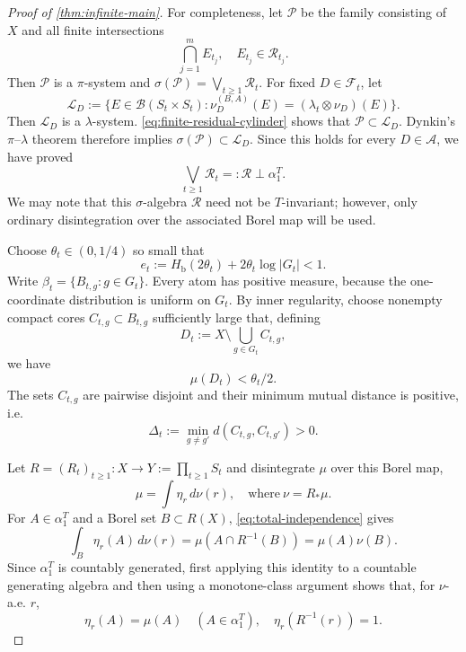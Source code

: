 \documentclass[12pt,letterpaper,reqno]{amsart}
\newcommand{\cR}{\mathcal R}
\newcommand{\join}{\bigvee}
\newcommand{\Hb}{H_{\mathrm b}}
\theoremstyle{definition}
\theoremstyle{remark}
\numberwithin{equation}{section}
\begin{document}
\begin{proof}[Proof of \cref{thm:infinite-main}]
		For completeness, let $\mathscr P$ be the family consisting of $X$ and all
		finite intersections
		\[
		\bigcap_{j=1}^m E_{t_j},
		\quad E_{t_j}\in\mathcal R_{t_j}.
		\]
		Then $\mathscr P$ is a $\pi$-system and
		$\sigma(\mathscr P)=\bigvee_{t\geq1}\mathcal R_t$. For fixed \(D\in\mathcal F_t\), let
		\[
		\mathscr L_D
		:=
		\{E\in\mathcal B(S_t\times S_t):
		\nu_D^{(B,A)}(E)=(\lambda_t\otimes\nu_D)(E)\}.
		\]
		Then \(\mathscr L_D\) is a \(\lambda\)-system.
		\eqref{eq:finite-residual-cylinder} shows that
		$\mathscr P\subset\mathscr L_D$.  Dynkin's $\pi$--$\lambda$ theorem therefore
		implies $\sigma(\mathscr P)\subset\mathscr L_D$.  Since this holds for every
		$D\in\mathcal A$, we have proved
		\begin{equation}
			\join_{t\geq1}\cR_t =:\cR
			\perp
			\alpha_1^T.
			\label{eq:total-independence}
		\end{equation}
		We may note that this $\sigma$-algebra $\cR$ need not be $T$-invariant; however, only ordinary
		disintegration over the associated Borel map will be used.
		
		
		Choose
		$\theta_t\in(0,1/4)$ so small that
		\begin{equation}
			e_t:=\Hb(2\theta_t)+2\theta_t\log|G_t|<1.
			\label{eq:hamming-error}
		\end{equation}
		Write $\beta_t=\{B_{t,g}:g\in G_t\}$.  Every atom has positive measure,
		because the one-coordinate distribution is uniform on
		$G_t$.  By inner regularity, choose nonempty compact cores
		$C_{t,g}\subset B_{t,g}$ sufficiently large that, defining
		\[
		D_t:=X\setminus\bigcup_{g\in G_t}C_{t,g},
		\]
		we have
		\begin{equation}
			\mu(D_t)<\theta_t/2.
			\label{eq:bad-set-small}
		\end{equation}
		The sets $C_{t,g}$ are pairwise disjoint and their minimum mutual distance is positive, i.e.
		\begin{equation}
			\Delta_t
			:=
			\min_{g\neq g'}d(C_{t,g},C_{t,g'})>0.
			\label{eq:compact-core-gap}
		\end{equation}
		
		Let $R=(R_t)_{t\geq1}: X \to Y:= \prod_{t\geq 1} S_t$ and disintegrate $\mu$ over this Borel map,
		\[
		\mu=\int\eta_r\,d\nu(r), \quad \text{where}~\nu=R_* \mu.
		\]
		For $A\in\alpha_1^T$ and a Borel set $B \subset R(X)$,
		\eqref{eq:total-independence} gives
		\[
		\int_B\eta_r(A)\,d\nu(r)
		=
		\mu(A\cap R^{-1}(B))
		=
		\mu(A)\nu(B).
		\]
		Since $\alpha_1^T$ is countably generated, first applying this identity to a
		countable generating algebra and then using a monotone-class argument shows
		that, for $\nu$-a.e.  $r$,
		\begin{equation}
			\eta_r(A)=\mu(A)
			\quad(A\in\alpha_1^T),
			\quad
			\eta_r(R^{-1}(r))=1.
			\label{eq:fiber-properties}
		\end{equation}
		

\end{proof}
\end{document}
